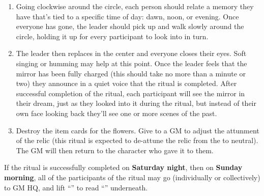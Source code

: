 \documentclass[green]{GL2020}
\begin{document}
\begin{enumerate}
\begin{itemize}
  \end{itemize}
  \item Going clockwise around the circle, each person should relate a memory they have that’s tied to a specific time of day: dawn, noon, or evening.
Once everyone has gone, the leader should pick up \iMirror{} and walk slowly around the circle, holding it up for every participant to look into in turn.
  \item The leader then replaces \iMirror{} in the center and everyone closes their eyes. Soft singing or humming may help at this point. Once the leader feels that the mirror has been fully charged (this should take no more than a minute or two) they announce in a quiet voice that the ritual is completed.
After successful completion of the ritual, each participant  will see the mirror in their dream, just as they looked into it during the ritual, but instead of their own face looking back they’ll see one or more scenes of the past.
  \item Destroy the item cards for the flowers. Give \iMirror{} to a GM to adjust the attunment of the relic (this ritual is expected to de-attune the relic from the \pTech{} to neutral). The GM will then return \iMirror{} to the character who gave it to them.
\end{enumerate}

If the ritual is successfully completed on \textbf{Saturday night}, then on \textbf{Sunday morning}, all of the participants of the ritual may go (individually or collectively) to GM HQ, and lift ``\sSignCOne{}'' to read ``\sSignCTwo{}'' underneath.
\end{document}
